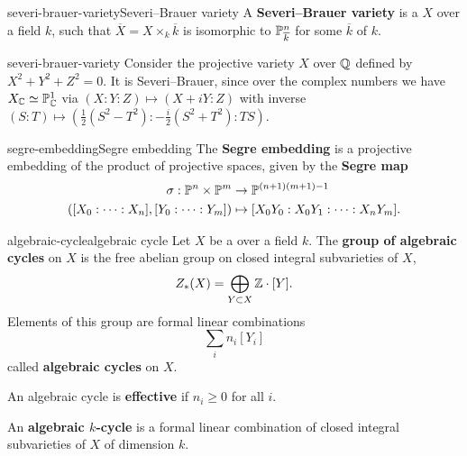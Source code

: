         

\begin{topic}{severi-brauer-variety}{Severi--Brauer variety}
    A \textbf{Severi--Brauer variety} is a  $X$ over a field $k$, such that $\overline{X} = X \times_k \overline{k}$ is isomorphic to $\mathbb{P}^n_{\overline{k}}$ for some  $\overline{k}$ of $k$.
\end{topic}

\begin{example}{severi-brauer-variety}
    Consider the projective variety $X$ over $\mathbb{Q}$ defined by $X^2 + Y^2 + Z^2 = 0$. It is Severi--Brauer, since over the complex numbers we have $X_{\mathbb{C}} \simeq \mathbb{P}_{\mathbb{C}}^1$ via $(X : Y : Z) \mapsto (X + iY : Z)$ with inverse $(S : T) \mapsto (\tfrac{1}{2} (S^2 - T^2) : -\tfrac{i}{2} (S^2 + T^2) : TS)$.
\end{example}

\begin{topic}{segre-embedding}{Segre embedding}
    The \textbf{Segre embedding} is a projective embedding of the product of projective spaces, given by the \textbf{Segre map}
    \[ \begin{aligned}
        \sigma : \mathbb{P}^n \times \mathbb{P}^m &\to \mathbb{P}^{(n + 1)(m + 1) - 1} \\
        ([X_0 : \cdots : X_n], [Y_0 : \cdots : Y_m]) &\mapsto [X_0 Y_0 : X_0 Y_1 : \cdots : X_n Y_m] .
    \end{aligned} \]
\end{topic}

\begin{topic}{algebraic-cycle}{algebraic cycle}
    Let $X$ be a  over a field $k$. The \textbf{group of algebraic cycles} on $X$ is the free abelian group on closed integral subvarieties of $X$,
    \[ Z_*(X) = \bigoplus_{Y \subset X} \mathbb{Z} \cdot [Y] . \] 
    Elements of this group are formal linear combinations
    \[ \sum_i n_i [Y_i] \]
    called \textbf{algebraic cycles} on $X$.
    
    An algebraic cycle is \textbf{effective} if $n_i \ge 0$ for all $i$.
    
    An \textbf{algebraic $k$-cycle} is a formal linear combination of closed integral subvarieties of $X$ of dimension $k$.
\end{topic}

